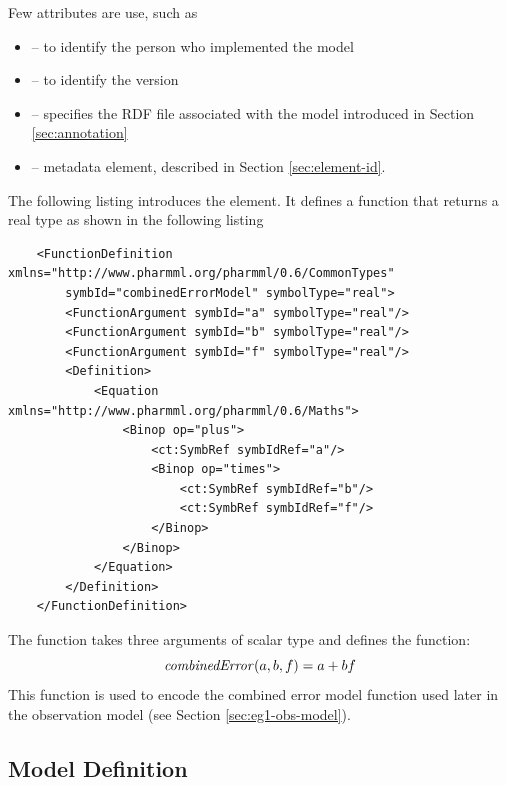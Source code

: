 Few attributes are use, such as
\begin{itemize}
\item
{} -- to identify the person who implemented the model
\item
{} -- to identify the \pharmml version
\item
{} -- specifies the RDF file associated with the model
introduced in Section \ref{sec:annotation}
\item
{} -- metadata element, described in Section \ref{sec:element-id}.
\end{itemize}

The following listing introduces the  element. 
It defines a function that returns a real type as shown in the following listing 
\lstset{language=XML}
\begin{lstlisting}
    <FunctionDefinition xmlns="http://www.pharmml.org/pharmml/0.6/CommonTypes" 
    	symbId="combinedErrorModel" symbolType="real">
        <FunctionArgument symbId="a" symbolType="real"/>
        <FunctionArgument symbId="b" symbolType="real"/>
        <FunctionArgument symbId="f" symbolType="real"/>
        <Definition>
            <Equation xmlns="http://www.pharmml.org/pharmml/0.6/Maths">
                <Binop op="plus">
                    <ct:SymbRef symbIdRef="a"/>
                    <Binop op="times">
                        <ct:SymbRef symbIdRef="b"/>
                        <ct:SymbRef symbIdRef="f"/>
                    </Binop>
                </Binop>
            </Equation>
        </Definition>
    </FunctionDefinition>
\end{lstlisting}

The function takes three arguments of scalar type and defines the
function:
\begin{displaymath}
\var{combinedError}(a, b, f) = a + bf
\end{displaymath}
This function is used to encode the combined error model function used later in
the observation model (see Section \ref{sec:eg1-obs-model}).


\subsection{Model Definition}

